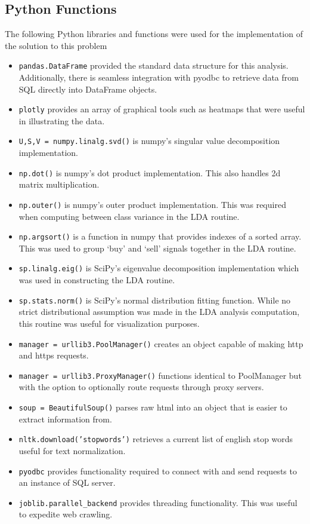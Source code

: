 \documentclass{article}
\begin{document}
\newpage
\begin{appendices}



\section{Python Functions}
\label{MatlabAppendix}
The following Python libraries and  functions were used for the implementation of the solution to this problem
\begin{itemize}

	\item \texttt{pandas.DataFrame} provided the standard data structure for this analysis.  Additionally, there is seamless integration with pyodbc to retrieve data from SQL directly into DataFrame objects.
	\item \texttt{plotly} provides an array of graphical tools such as heatmaps that were useful in illustrating the data.
	\item \texttt{U,S,V = numpy.linalg.svd()} is numpy's singular value decomposition implementation.
	\item \texttt{np.dot()} is numpy's dot product implementation.  This also handles 2d matrix multiplication.
	\item \texttt{np.outer()} is numpy's outer product implementation.  This was required when computing between class variance in the LDA routine.
	\item \texttt{np.argsort()} is a function in numpy that provides indexes of a sorted array.  This was used to group `buy' and `sell' signals together in the LDA routine.
	\item \texttt{sp.linalg.eig()} is SciPy's eigenvalue decomposition implementation which was used in constructing the LDA routine.
	\item \texttt{sp.stats.norm()} is SciPy's normal distribution fitting function.  While no strict distributional assumption was made in the LDA analysis computation, this routine was useful for visualization purposes.
	\item \texttt{manager = urllib3.PoolManager()} creates an object capable of making http and https requests.
	\item \texttt{manager = urllib3.ProxyManager()} functions identical to PoolManager but with the option to optionally route requests through proxy servers.	
	\item \texttt{soup = BeautifulSoup()} parses raw html into an object that is easier to extract information from.		
	\item \texttt{nltk.download('stopwords')} retrieves a current list of english stop words useful for text normalization.	
	\item \texttt{pyodbc} provides functionality required to connect with and send requests to an instance of SQL server.
	\item \texttt{joblib.parallel\_backend} provides threading functionality.  This was useful to expedite web crawling.	
	

\end{itemize}
\end{appendices}
\end{document}
